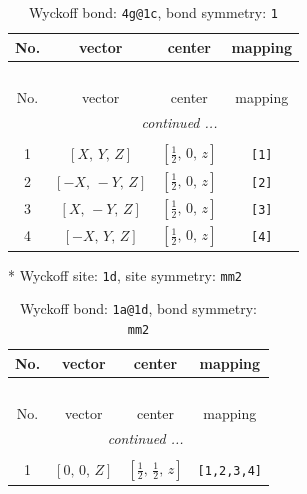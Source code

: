 \documentclass[fleqn,8pt]{jsarticle}
\begin{document}
\begin{longtable}{cccc}
\caption{Wyckoff bond: {\tt 4g@1c}, bond symmetry: {\tt 1}}
 \\
 \hline \hline
No. & vector & center & mapping \\ \hline \endfirsthead

\multicolumn{3}{l}{\tablename\ \thetable{}} \\
 \hline \hline
No. & vector & center & mapping \\ \hline \endhead

 \hline \hline
\multicolumn{3}{r}{\footnotesize\it continued ...} \\ \endfoot

 \hline \hline
\multicolumn{3}{r}{} \\ \endlastfoot

1 & $\left[ X,\, Y,\, Z \right]$ & $\left[ \frac{1}{2},\, 0,\, z \right]$ & {\tt [1]} \\ \hline
2 & $\left[ - X,\, - Y,\, Z \right]$ & $\left[ \frac{1}{2},\, 0,\, z \right]$ & {\tt [2]} \\ \hline
3 & $\left[ X,\, - Y,\, Z \right]$ & $\left[ \frac{1}{2},\, 0,\, z \right]$ & {\tt [3]} \\ \hline
4 & $\left[ - X,\, Y,\, Z \right]$ & $\left[ \frac{1}{2},\, 0,\, z \right]$ & {\tt [4]} \\
\end{longtable}
* Wyckoff site: {\tt 1d}, site symmetry: {\tt mm2}
\renewcommand{\arraystretch}{1.2}
\begin{longtable}{cccc}
\caption{Wyckoff bond: {\tt 1a@1d}, bond symmetry: {\tt mm2}}
 \\
 \hline \hline
No. & vector & center & mapping \\ \hline \endfirsthead

\multicolumn{3}{l}{\tablename\ \thetable{}} \\
 \hline \hline
No. & vector & center & mapping \\ \hline \endhead

 \hline \hline
\multicolumn{3}{r}{\footnotesize\it continued ...} \\ \endfoot

 \hline \hline
\multicolumn{3}{r}{} \\ \endlastfoot

1 & $\left[ 0,\, 0,\, Z \right]$ & $\left[ \frac{1}{2},\, \frac{1}{2},\, z \right]$ & {\tt [1,2,3,4]} \\
\end{longtable}
\renewcommand{\arraystretch}{1.2}
\end{document}
